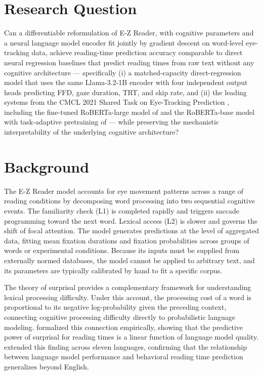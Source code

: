 \documentclass[12pt]{article}
\begin{document}
\section{Research Question}

Can a differentiable reformulation of E-Z Reader, with cognitive parameters
and a neural language model encoder fit jointly by gradient descent on
word-level eye-tracking data, achieve reading-time prediction accuracy
comparable to direct neural regression baselines that predict reading times
from raw text without any cognitive architecture --- specifically (i) a
matched-capacity direct-regression model that uses the same Llama-3.2-1B
encoder with four independent output heads predicting FFD, gaze duration,
TRT, and skip rate, and (ii) the leading systems from the CMCL 2021 Shared
Task on Eye-Tracking Prediction \citep{hollenstein2021cmcl}, including the
fine-tuned RoBERTa-large model of \citet{liohio2021cmcl} and the RoBERTa-base
model with task-adaptive pretraining of \citet{litorontocl2021cmcl} ---
while preserving the mechanistic interpretability of the underlying cognitive
architecture?

\section{Background}

The E-Z Reader model \citep{reichle1998toward} accounts for eye movement
patterns across a range of reading conditions by decomposing word processing
into two sequential cognitive events. The familiarity check (L1) is completed
rapidly and triggers saccade programming toward the next word. Lexical access
(L2) is slower and governs the shift of focal attention. The model generates
predictions at the level of aggregated data, fitting mean fixation durations
and fixation probabilities across groups of words or experimental conditions.
Because its inputs must be supplied from externally normed databases, the model
cannot be applied to arbitrary text, and its parameters are typically
calibrated by hand to fit a specific corpus.

The theory of surprisal \citep{levy2008expectation} provides a complementary
framework for understanding lexical processing difficulty. Under this account,
the processing cost of a word is proportional to its negative log-probability
given the preceding context, connecting cognitive processing difficulty directly
to probabilistic language modeling. \citet{goodkind2018predictive} formalized
this connection empirically, showing that the predictive power of surprisal for
reading times is a linear function of language model quality.
\citet{wilcox2023testing} extended this finding across eleven languages,
confirming that the relationship between language model performance and
behavioral reading time prediction generalizes beyond English.
\end{document}
